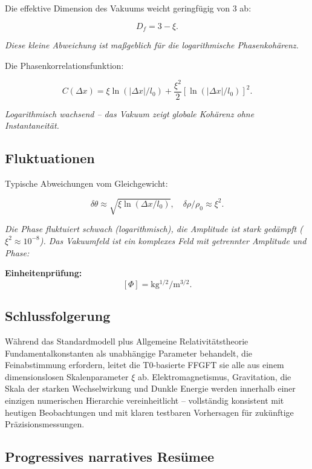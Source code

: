 	Die effektive Dimension des Vakuums weicht geringfügig von 3 ab:
	
	\begin{equation}
		D_f = 3 - \xi.
	\end{equation}
	
	\textit{Diese kleine Abweichung ist maßgeblich für die logarithmische Phasenkohärenz.}
	
	Die Phasenkorrelationsfunktion:
	
	\begin{equation}
		C(\Delta x) = \xi \ln(|\Delta x|/l_0) + \frac{\xi^2}{2} [\ln(|\Delta x|/l_0)]^2.
	\end{equation}
	
	\textit{Logarithmisch wachsend – das Vakuum zeigt globale Kohärenz ohne Instantaneität.}
	
	\subsection*{Fluktuationen}
	
	Typische Abweichungen vom Gleichgewicht:
	
	\begin{equation}
		\delta \theta \approx \sqrt{\xi \ln(\Delta x / l_0)}, \quad \delta \rho / \rho_0 \approx \xi^2.
	\end{equation}
	
	\textit{Die Phase fluktuiert schwach (logarithmisch), die Amplitude ist stark gedämpft (\(\xi^2 \approx 10^{-8}\)). Das Vakuumfeld ist ein komplexes Feld mit getrennter Amplitude und Phase:}
	
	\textbf{Einheitenprüfung:}
	\[
	[\Phi] = \si{\kilo\gram^{1/2}\per\meter^{3/2}}.
	\]
	
	\subsection*{Schlussfolgerung}
	
	Während das Standardmodell plus Allgemeine Relativitätstheorie Fundamentalkonstanten als unabhängige Parameter behandelt, die Feinabstimmung erfordern, leitet die T0-basierte FFGFT sie alle aus einem dimensionslosen Skalenparameter \(\xi\) ab. Elektromagnetismus, Gravitation, die Skala der starken Wechselwirkung und Dunkle Energie werden innerhalb einer einzigen numerischen Hierarchie vereinheitlicht – vollständig konsistent mit heutigen Beobachtungen und mit klaren testbaren Vorhersagen für zukünftige Präzisionsmessungen.
	
	\subsection*{Progressives narratives Resümee}
	
